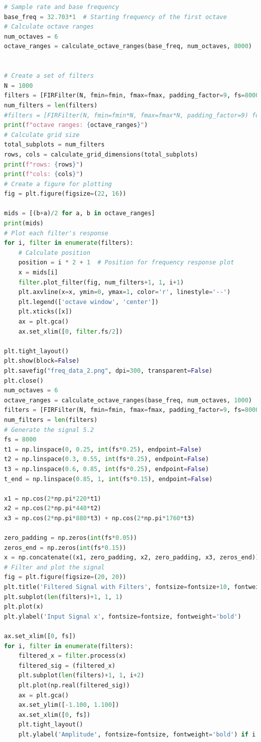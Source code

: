 \documentclass[a4paper, 11pt]{exam}
\begin{document}
\begin{lstlisting}[language=Python]
# Sample rate and base frequency
base_freq = 32.703*1  # Starting frequency of the first octave
# Calculate octave ranges
num_octaves = 6
octave_ranges = calculate_octave_ranges(base_freq, num_octaves, 8000)


# Create a set of filters
N = 1000
filters = [FIRFilter(N, fmin=fmin, fmax=fmax, padding_factor=9, fs=8000) for fmin, fmax in octave_ranges]
num_filters = len(filters)
#filters = [FIRFilter(N, fmin=fmin*N, fmax=fmax*N, padding_factor=9) for fmin, fmax in octave_ranges]
print(f"octave ranges: {octave_ranges}")
# Calculate grid size
total_subplots = num_filters
rows, cols = calculate_grid_dimensions(total_subplots)
print(f"rows: {rows}")
print(f"cols: {cols}")
# Create a figure for plotting
fig = plt.figure(figsize=(22, 16))

mids = [(b+a)/2 for a, b in octave_ranges]
print(mids)
# Plot each filter's response
for i, filter in enumerate(filters):
    # Calculate position
    position = i * 2 + 1  # Position for frequency response plot
    x = mids[i]
    filter.plot_filter(fig, num_filters+1, 1, i+1)
    plt.axvline(x=x, ymin=0, ymax=1, color='r', linestyle='--')
    plt.legend(['octave window', 'center'])
    plt.xticks([x])
    ax = plt.gca()
    ax.set_xlim([0, filter.fs/2])

plt.tight_layout()
plt.show(block=False)
plt.savefig("freq_data_2.png", dpi=300, transparent=False)
plt.close()
num_octaves = 6
octave_ranges = calculate_octave_ranges(base_freq, num_octaves, 1000)
filters = [FIRFilter(N, fmin=fmin, fmax=fmax, padding_factor=9, fs=8000) for fmin, fmax in octave_ranges]
num_filters = len(filters)
# Generate the signal 5.2
fs = 8000
t1 = np.linspace(0, 0.25, int(fs*0.25), endpoint=False)
t2 = np.linspace(0.3, 0.55, int(fs*0.25), endpoint=False)
t3 = np.linspace(0.6, 0.85, int(fs*0.25), endpoint=False)
t_end = np.linspace(0.85, 1, int(fs*0.15), endpoint=False)

x1 = np.cos(2*np.pi*220*t1)
x2 = np.cos(2*np.pi*440*t2)
x3 = np.cos(2*np.pi*880*t3) + np.cos(2*np.pi*1760*t3)

zero_padding = np.zeros(int(fs*0.05))
zeros_end = np.zeros(int(fs*0.15))
x = np.concatenate((x1, zero_padding, x2, zero_padding, x3, zeros_end))
# Filter and plot the signal
fig = plt.figure(figsize=(20, 20))
plt.title('Filtered Signal with Filters', fontsize=fontsize+10, fontweight='bold')
plt.subplot(len(filters)+1, 1, 1)
plt.plot(x)
plt.ylabel('Input Signal x', fontsize=fontsize, fontweight='bold')

ax.set_xlim([0, fs])
for i, filter in enumerate(filters):
    filtered_x = filter.process(x)
    filtered_sig = (filtered_x)
    plt.subplot(len(filters)+1, 1, i+2)
    plt.plot(np.real(filtered_sig))
    ax = plt.gca()
    ax.set_ylim([-1.100, 1.100])
    ax.set_xlim([0, fs])
    plt.tight_layout()
    plt.ylabel('Amplitude', fontsize=fontsize, fontweight='bold') if i == (len(filters)//2) else None



\end{lstlisting}
\end{document}
